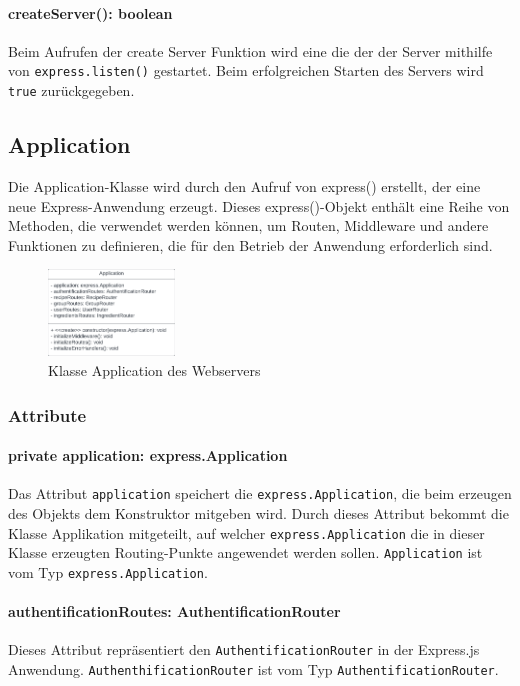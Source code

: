 \documentclass[parskip=full]{scrartcl}
\begin{document}
\paragraph{createServer(): boolean}Beim Aufrufen der create Server Funktion wird eine die der der Server mithilfe von \texttt{express.listen()} gestartet. Beim erfolgreichen Starten des Servers wird \texttt{true} zurückgegeben.


\subsection{Application}
Die Application-Klasse wird durch den Aufruf von express() erstellt, der eine neue Express-Anwendung erzeugt. Dieses express()-Objekt enthält eine Reihe von Methoden, die verwendet werden können, um Routen, Middleware und andere Funktionen zu definieren, die für den Betrieb der Anwendung erforderlich sind.

\begin{figure}[htp]
    \centering
    \includegraphics[width = 0.3\textwidth]{images/webserver/application.pdf}
    \caption{Klasse Application des Webservers}
    \label{fig:application}
\end{figure}

\subsubsection*{Attribute}
\paragraph{private application: express.Application}Das Attribut \texttt{application} speichert die \newline
\texttt{express.Application}, die beim erzeugen des Objekts dem Konstruktor mitgeben wird.
Durch dieses Attribut bekommt die Klasse Applikation mitgeteilt, auf welcher \texttt{express.Application} die in dieser Klasse erzeugten Routing-Punkte angewendet werden sollen.
\texttt{Application} ist vom Typ \texttt{express.Application}.
\paragraph{authentificationRoutes: AuthentificationRouter}Dieses Attribut repräsentiert den \texttt{AuthentificationRouter} in der Express.js Anwendung. \texttt{AuthenthificationRouter} ist vom Typ \texttt{AuthentificationRouter}.
\end{document}
